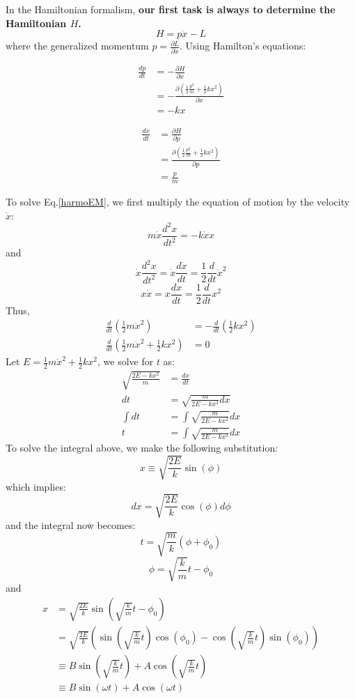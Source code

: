 In the Hamiltonian formalism, \textbf{our first task is always to determine the Hamiltonian $H$.}
$$
H=p \dot{x}-L
$$
where the generalized momentum $p=\frac{\partial L}{\partial \dot{x}}$. Using Hamilton's equations:

$$\begin{aligned} \frac{d p}{d t} &=-\frac{\partial H}{\partial x} \\ &=-\frac{\partial\left(\frac{1}{2} \frac{p^{2}}{m}+\frac{1}{2} k x^{2}\right)}{\partial x} \\ &=-k x \end{aligned}$$

$$\begin{aligned} \frac{d x}{d t} &=\frac{\partial H}{\partial p} \\ &=\frac{\partial\left(\frac{1}{2} \frac{p^{2}}{m}+\frac{1}{2} k x^{2}\right)}{\partial p} \\ &=\frac{p}{m} \end{aligned}$$

To solve Eq.\ref{harmoEM}, we first multiply the equation of motion by the velocity $\dot{x}$:
$$
m \dot{x} \frac{d^{2} x}{d t^{2}}=-k \dot{x} x
$$
and
$$
\dot{x} \frac{d^{2} x}{d t^{2}}=\dot{x} \frac{d \dot{x}}{d t}=\frac{1}{2} \frac{d}{d t} \dot{x}^{2}
$$
$$
x \dot{x}=x \frac{d x}{d t}=\frac{1}{2} \frac{d}{d t} x^{2}
$$
Thus,
$$
\begin{aligned}
\frac{d}{d t}\left(\frac{1}{2} m \dot{x}^{2}\right) &=-\frac{d}{d t}\left(\frac{1}{2} k x^{2}\right) \\
\frac{d}{d t}\left(\frac{1}{2} m \dot{x}^{2}+\frac{1}{2} k x^{2}\right) &=0
\end{aligned}
$$
Let $E=\frac{1}{2} m \dot{x}^{2}+\frac{1}{2} k x^{2}$, we solve for $t$ as:
$$\begin{aligned} \sqrt{\frac{2 E-k x^{2}}{m}} &=\frac{d x}{d t} \\ d t &=\sqrt{\frac{m}{2 E-k x^{2}} d x} \\ \int d t &=\int \sqrt{\frac{m}{2 E-k x^{2}}} d x \\ t &=\int \sqrt{\frac{m}{2 E-k x^{2}}} d x \end{aligned}$$
To solve the integral above, we make the following substitution:
$$
x \equiv \sqrt{\frac{2 E}{k}} \sin (\phi)
$$
which implies:
$$
d x=\sqrt{\frac{2 E}{k}} \cos (\phi) d \phi
$$
and the integral now becomes:
$$
t=\sqrt{\frac{m}{k}}(\phi+\phi_0)
$$
$$
\phi=\sqrt{\frac{k}{m}} t-\phi_{0}
$$
and
$$
\begin{aligned}
x &=\sqrt{\frac{2 E}{k}} \sin \left(\sqrt{\frac{k}{m}} t-\phi_{0}\right) \\
&=\sqrt{\frac{2 E}{k}}\left(\sin (\sqrt{\frac{k}{m}} t) \cos \left(\phi_{0}\right)-\cos (\sqrt{\frac{k}{m}} t) \sin \left(\phi_{0}\right)\right) \\
& \equiv B \sin (\sqrt{\frac{k}{m}} t)+A \cos (\sqrt{\frac{k}{m}} t) \\
& \equiv B \sin (\omega t)+A \cos (\omega t)
\end{aligned}
$$

